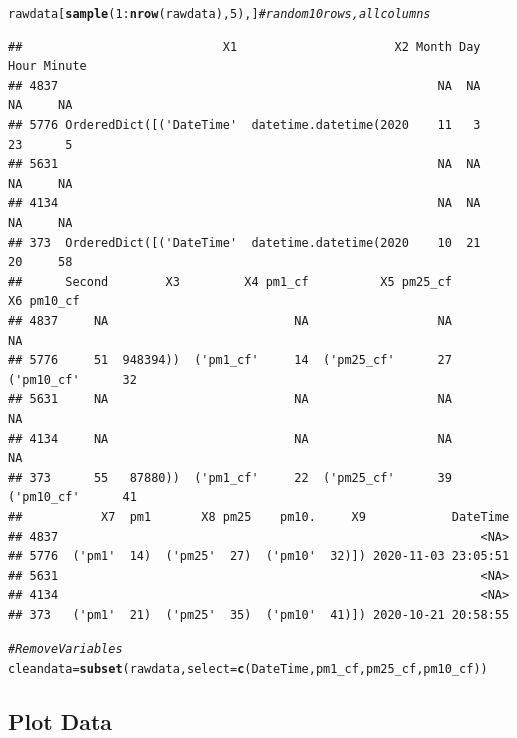 \documentclass{article}\usepackage[]{graphicx}\usepackage[]{color}
\makeatletter
\newcommand{\hlnum}[1]{\textcolor[rgb]{0.686,0.059,0.569}{#1}}%
\newcommand{\hlcom}[1]{\textcolor[rgb]{0.678,0.584,0.686}{\textit{#1}}}%
\newcommand{\hlopt}[1]{\textcolor[rgb]{0,0,0}{#1}}%
\newcommand{\hlstd}[1]{\textcolor[rgb]{0.345,0.345,0.345}{#1}}%
\newcommand{\hlkwb}[1]{\textcolor[rgb]{0.69,0.353,0.396}{#1}}%
\newcommand{\hlkwc}[1]{\textcolor[rgb]{0.333,0.667,0.333}{#1}}%
\newcommand{\hlkwd}[1]{\textcolor[rgb]{0.737,0.353,0.396}{\textbf{#1}}}%
\newenvironment{kframe}{%
 \def\at@end@of@kframe{}%
 \ifinner\ifhmode%
  \def\at@end@of@kframe{\end{minipage}}%
  \begin{minipage}{\columnwidth}%
 \fi\fi%
 \def\FrameCommand##1{\hskip\@totalleftmargin \hskip-\fboxsep
 \colorbox{shadecolor}{##1}\hskip-\fboxsep
     \hskip-\linewidth \hskip-\@totalleftmargin \hskip\columnwidth}%
 \MakeFramed {\advance\hsize-\width
   \@totalleftmargin\z@ \linewidth\hsize
   \@setminipage}}%
 {\par\unskip\endMakeFramed%
 \at@end@of@kframe}
\newenvironment{knitrout}{}{} %
\makeatother
\begin{document}
\begin{knitrout}
\color{fgcolor}\begin{kframe}
\begin{alltt}
\hlstd{rawdata[}\hlkwd{sample}\hlstd{(}\hlnum{1}\hlopt{:}\hlkwd{nrow}\hlstd{(rawdata),} \hlnum{5}\hlstd{),]} \hlcom{# random 10 rows, all columns}
\end{alltt}
\begin{verbatim}
##                            X1                      X2 Month Day Hour Minute
## 4837                                                     NA  NA   NA     NA
## 5776 OrderedDict([('DateTime'  datetime.datetime(2020    11   3   23      5
## 5631                                                     NA  NA   NA     NA
## 4134                                                     NA  NA   NA     NA
## 373  OrderedDict([('DateTime'  datetime.datetime(2020    10  21   20     58
##      Second        X3         X4 pm1_cf          X5 pm25_cf          X6 pm10_cf
## 4837     NA                          NA                  NA                  NA
## 5776     51  948394))  ('pm1_cf'     14  ('pm25_cf'      27  ('pm10_cf'      32
## 5631     NA                          NA                  NA                  NA
## 4134     NA                          NA                  NA                  NA
## 373      55   87880))  ('pm1_cf'     22  ('pm25_cf'      39  ('pm10_cf'      41
##           X7  pm1       X8 pm25    pm10.     X9            DateTime
## 4837                                                           <NA>
## 5776  ('pm1'  14)  ('pm25'  27)  ('pm10'  32)]) 2020-11-03 23:05:51
## 5631                                                           <NA>
## 4134                                                           <NA>
## 373   ('pm1'  21)  ('pm25'  35)  ('pm10'  41)]) 2020-10-21 20:58:55
\end{verbatim}
\begin{alltt}
\hlcom{# Remove Variables}
\hlstd{cleandata} \hlkwb{=} \hlkwd{subset}\hlstd{(rawdata,} \hlkwc{select}\hlstd{=}\hlkwd{c}\hlstd{(DateTime, pm1_cf, pm25_cf, pm10_cf))}
\end{alltt}
\end{kframe}
\end{knitrout}

\subsection{Plot Data}
\end{document}
